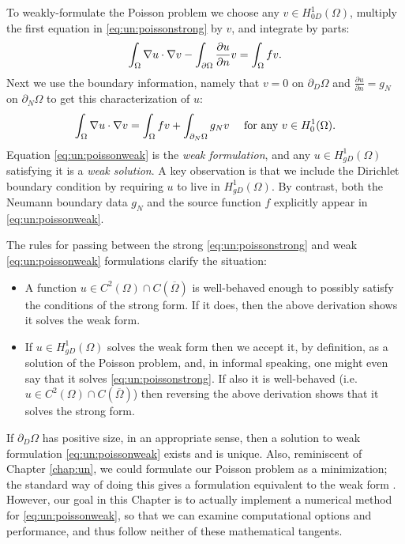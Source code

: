 To weakly-formulate the Poisson problem we choose any $v\in H_{0D}^1(\Omega)$, multiply the first equation in \eqref{eq:un:poissonstrong} by $v$, and integrate by parts:
\begin{equation*}
\int_\Omega \nabla u \cdot \nabla v - \int_{\partial\Omega} \frac{\partial u}{\partial n} v = \int_\Omega f v.
\end{equation*}
Next we use the boundary information, namely that $v=0$ on $\partial_D\Omega$ and $\frac{\partial u}{\partial n}=g_N$ on $\partial_N\Omega$ to get this characterization of $u$:
\begin{equation}
\int_\Omega \nabla u \cdot \nabla v = \int_\Omega f v + \int_{\partial_N\Omega} g_N v\quad \text{ for any } v\in H_0^1(\Omega). \label{eq:un:poissonweak}
\end{equation}
Equation \eqref{eq:un:poissonweak} is the \emph{weak formulation}, and any $u \in H_{gD}^1(\Omega)$ satisfying it is a \emph{weak solution}.  A key observation is that we include the Dirichlet boundary condition by requiring $u$ to live in $H_{gD}^1(\Omega)$.  By contrast, both the Neumann boundary data $g_N$ and the source function $f$ explicitly appear in \eqref{eq:un:poissonweak}.

The rules for passing between the strong \eqref{eq:un:poissonstrong} and weak \eqref{eq:un:poissonweak} formulations clarify the situation:\begin{itemize}
\item A function $u \in C^2(\Omega) \cap C(\overline \Omega)$ is well-behaved enough to possibly satisfy the conditions of the strong form.  If it does, then the above derivation shows it solves the weak form.
\item If $u \in H_{gD}^1(\Omega)$ solves the weak form then we accept it, by definition, as a solution of the Poisson problem, and, in informal speaking, one might even say that it solves \eqref{eq:un:poissonstrong}.  If also it is well-behaved (i.e.~$u \in C^2(\Omega) \cap C(\overline \Omega)$) then reversing the above derivation shows that it solves the strong form.
\end{itemize}

If $\partial_D \Omega$ has positive size, in an appropriate sense, then a solution to weak formulation \eqref{eq:un:poissonweak} exists and is unique.  Also, reminiscent of Chapter \ref{chap:un}, we could formulate our Poisson problem as a minimization; the standard way of doing this gives a formulation equivalent to the weak form \citep{Evans2010}.  However, our goal in this Chapter is to actually implement a numerical method for \eqref{eq:un:poissonweak}, so that we can examine computational options and performance, and thus follow neither of these mathematical tangents.


